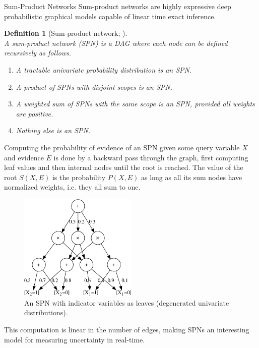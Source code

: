 \documentclass[final,hyperref={pdfpagelabels=false},notheorems]{beamer}
\theoremstyle{thesisstyle}
\newtheorem{definition}{Definition}
\begin{document}
\begin{frame}[t]
\begin{columns}[t]
\begin{column}{.5225\textwidth}
    \begin{block}{Sum-Product Networks}
      Sum-product networks are highly expressive deep probabilistic graphical models capable of
      linear time exact inference.
      \begin{definition}[Sum-product network; \cite{gens-domingos}]~\\
        A sum-product network (SPN) is a DAG where each node can be defined recursively as follows.
        \begin{enumerate}
          \item A tractable univariate probability distribution is an SPN\@.
          \item A product of SPNs with disjoint scopes is an SPN\@.
          \item A weighted sum of SPNs with the same scope is an SPN, provided all weights are positive.
          \item Nothing else is an SPN\@.
        \end{enumerate}
      \end{definition}
      Computing the probability of evidence of an SPN given some query variable $X$ and evidence
      $E$ is done by a backward pass through the graph, first computing leaf values and then
      internal nodes until the root is reached. The value of the root $S(X,E)$ is the probability
      $P(X,E)$ as long as all its sum nodes have normalized weights, i.e. they all sum to one.
      \begin{figure}[h]
        \centering\includegraphics[width=0.5\textwidth]{imgs/sample_spn.png}
        \caption{An SPN with indicator variables as leaves (degenerated univariate distributions).}
      \end{figure}
      This computation is linear in the number of edges, making SPNs an interesting model for
      measuring uncertainty in real-time.
    \end{block}


\end{column}
\end{columns}
\end{frame}
\end{document}
